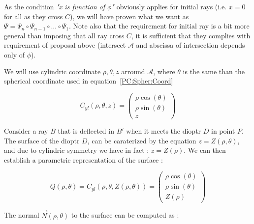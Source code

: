 As the condition \emph{"x is function of $\phi$"} obviously applies for initial rays (i.e. $x=0$ for all as they cross $C$),
we will have proven what we want as $\Psi = \Psi_n \circ  \Psi_{n-1} \circ \dots \circ \Psi_1$. Note also that the requirement
for initial ray is a bit more general than imposing that all ray cross $C$, it is sufficient that they complies with requirement
of proposal above (intersect $\mathcal{A}$ and abscissa of intersection depends only of $\phi$).


We will use cylindric coordinate $\rho,\theta,z$ arround $\mathcal{A}$, where $\theta$ is the same than the spherical
coordinate used in equation~\ref{PC:Spher:Coord}

\begin{equation}
	C_{yl}(\rho,\theta,z)   =\begin{pmatrix} \rho \cos(\theta)  \\ \rho \sin(\theta)   \\ z \end{pmatrix}
	     \label{PC:Cyl:Coord}
\end{equation}

Consider a ray $B$ that is deflected in $B'$ when it meets the dioptr  $D$ in point $P$.
The surface of the dioptr $D$, can be caraterized by the equation $z=Z(\rho,\theta)$, and due to cylindric symmetry we have in fact :
$z=Z(\rho)$.  We can then establish a parametric representation of the surface :

\begin{equation}
	Q(\rho,\theta) =  C_{yl}(\rho,\theta,Z(\rho,\theta)) = \begin{pmatrix} \rho \cos(\theta)  \\ \rho \sin(\theta)   \\ Z(\rho) \end{pmatrix}
\end{equation}

The normal $\vec{N}(\rho,\theta) $ to the surface can be computed as :


